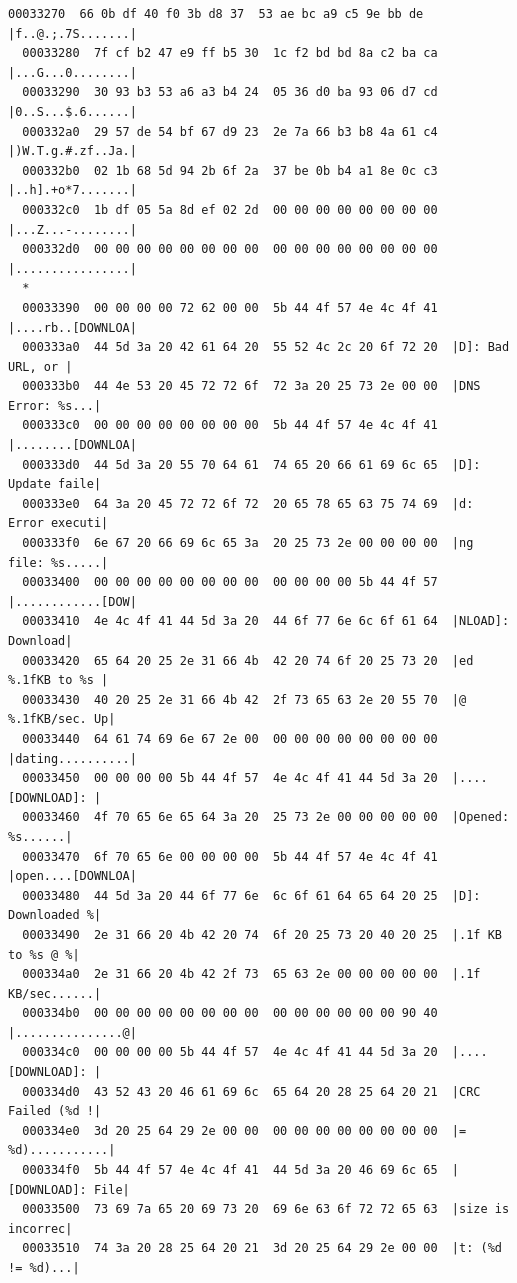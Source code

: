 \documentclass[]{project_plan}
\begin{document}
\begin{lstlisting}[basicstyle=\tiny]
  00033270  66 0b df 40 f0 3b d8 37  53 ae bc a9 c5 9e bb de  |f..@.;.7S.......|
  00033280  7f cf b2 47 e9 ff b5 30  1c f2 bd bd 8a c2 ba ca  |...G...0........|
  00033290  30 93 b3 53 a6 a3 b4 24  05 36 d0 ba 93 06 d7 cd  |0..S...$.6......|
  000332a0  29 57 de 54 bf 67 d9 23  2e 7a 66 b3 b8 4a 61 c4  |)W.T.g.#.zf..Ja.|
  000332b0  02 1b 68 5d 94 2b 6f 2a  37 be 0b b4 a1 8e 0c c3  |..h].+o*7.......|
  000332c0  1b df 05 5a 8d ef 02 2d  00 00 00 00 00 00 00 00  |...Z...-........|
  000332d0  00 00 00 00 00 00 00 00  00 00 00 00 00 00 00 00  |................|
  *
  00033390  00 00 00 00 72 62 00 00  5b 44 4f 57 4e 4c 4f 41  |....rb..[DOWNLOA|
  000333a0  44 5d 3a 20 42 61 64 20  55 52 4c 2c 20 6f 72 20  |D]: Bad URL, or |
  000333b0  44 4e 53 20 45 72 72 6f  72 3a 20 25 73 2e 00 00  |DNS Error: %s...|
  000333c0  00 00 00 00 00 00 00 00  5b 44 4f 57 4e 4c 4f 41  |........[DOWNLOA|
  000333d0  44 5d 3a 20 55 70 64 61  74 65 20 66 61 69 6c 65  |D]: Update faile|
  000333e0  64 3a 20 45 72 72 6f 72  20 65 78 65 63 75 74 69  |d: Error executi|
  000333f0  6e 67 20 66 69 6c 65 3a  20 25 73 2e 00 00 00 00  |ng file: %s.....|
  00033400  00 00 00 00 00 00 00 00  00 00 00 00 5b 44 4f 57  |............[DOW|
  00033410  4e 4c 4f 41 44 5d 3a 20  44 6f 77 6e 6c 6f 61 64  |NLOAD]: Download|
  00033420  65 64 20 25 2e 31 66 4b  42 20 74 6f 20 25 73 20  |ed %.1fKB to %s |
  00033430  40 20 25 2e 31 66 4b 42  2f 73 65 63 2e 20 55 70  |@ %.1fKB/sec. Up|
  00033440  64 61 74 69 6e 67 2e 00  00 00 00 00 00 00 00 00  |dating..........|
  00033450  00 00 00 00 5b 44 4f 57  4e 4c 4f 41 44 5d 3a 20  |....[DOWNLOAD]: |
  00033460  4f 70 65 6e 65 64 3a 20  25 73 2e 00 00 00 00 00  |Opened: %s......|
  00033470  6f 70 65 6e 00 00 00 00  5b 44 4f 57 4e 4c 4f 41  |open....[DOWNLOA|
  00033480  44 5d 3a 20 44 6f 77 6e  6c 6f 61 64 65 64 20 25  |D]: Downloaded %|
  00033490  2e 31 66 20 4b 42 20 74  6f 20 25 73 20 40 20 25  |.1f KB to %s @ %|
  000334a0  2e 31 66 20 4b 42 2f 73  65 63 2e 00 00 00 00 00  |.1f KB/sec......|
  000334b0  00 00 00 00 00 00 00 00  00 00 00 00 00 00 90 40  |...............@|
  000334c0  00 00 00 00 5b 44 4f 57  4e 4c 4f 41 44 5d 3a 20  |....[DOWNLOAD]: |
  000334d0  43 52 43 20 46 61 69 6c  65 64 20 28 25 64 20 21  |CRC Failed (%d !|
  000334e0  3d 20 25 64 29 2e 00 00  00 00 00 00 00 00 00 00  |= %d)...........|
  000334f0  5b 44 4f 57 4e 4c 4f 41  44 5d 3a 20 46 69 6c 65  |[DOWNLOAD]: File|
  00033500  73 69 7a 65 20 69 73 20  69 6e 63 6f 72 72 65 63  |size is incorrec|
  00033510  74 3a 20 28 25 64 20 21  3d 20 25 64 29 2e 00 00  |t: (%d != %d)...|

\end{lstlisting}
\end{document}
